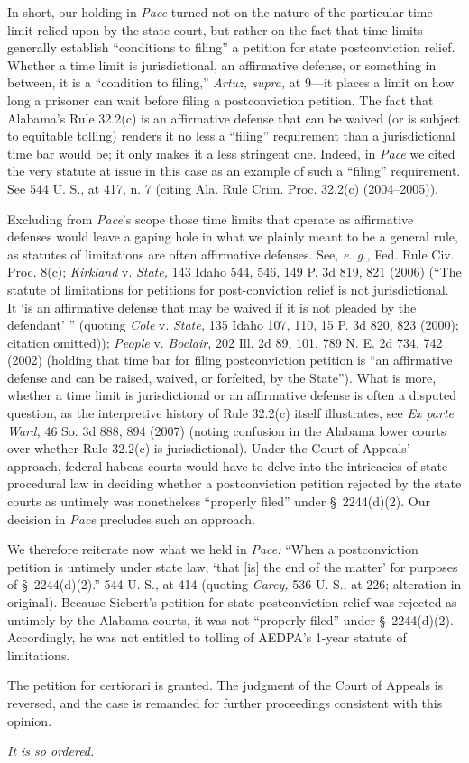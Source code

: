   In short, our holding in \emph{Pace} turned not on the nature of the
particular time limit relied upon by the state court, but rather on the
fact that time limits generally establish ``conditions to filing''
a petition for state postconviction relief. Whether a time limit is
jurisdictional, an affirmative defense, or something in between, it is
a ``condition to filing,'' \emph{Artuz, supra,} at 9---it places a
limit on how long a prisoner can wait before filing a postconviction
petition. The fact that Alabama's Rule 32.2(c) is an affirmative
defense that can be waived (or is subject to equitable tolling) renders
it no less a ``filing'' requirement than a jurisdictional time bar
would be; it only makes it a less stringent one. Indeed, in \emph{Pace}
we cited the very statute at issue in this case as an example of such
a ``filing'' requirement. See 544 U. S., at 417, n. 7 (citing Ala.
Rule Crim. Proc. 32.2(c) (2004--2005)).

  Excluding from \emph{Pace}'s scope those time limits that operate
as affirmative defenses would leave a gaping hole in what we plainly
meant to be a general rule, as statutes of limitations are often
affirmative defenses. See, \emph{e. g.,} Fed. Rule Civ. \newpage  Proc.
8(c); \emph{Kirkland} v. \emph{State,} 143 Idaho 544, 546, 149 P. 3d 819, 821
(2006) (``The statute of limitations for petitions for post-conviction
relief is not jurisdictional. It ‘is an affirmative defense that may
be waived if it is not pleaded by the defendant' '' (quoting \emph{Cole}
v. \emph{State,} 135 Idaho 107, 110, 15 P. 3d 820, 823 (2000); citation
omitted)); \emph{People} v. \emph{Boclair,} 202 Ill. 2d 89, 101, 789 N. E.
2d 734, 742 (2002) (holding that time bar for filing postconviction
petition is ``an affirmative defense and can be raised, waived, or
forfeited, by the State''). What is more, whether a time limit is
jurisdictional or an affirmative defense is often a disputed question,
as the interpretive history of Rule 32.2(c) itself illustrates, see
\emph{Ex parte Ward,} 46 So. 3d 888, 894 (2007) (noting confusion in the
Alabama lower courts over whether Rule 32.2(c) is jurisdictional).
Under the Court of Appeals' approach, federal habeas courts would
have to delve into the intricacies of state procedural law in deciding
whether a postconviction petition rejected by the state courts as
untimely was nonetheless ``properly filed'' under \S~2244(d)(2). Our
decision in \emph{Pace} precludes such an approach.

  We therefore reiterate now what we held in \emph{Pace:} ``When a
postconviction petition is untimely under state law, ‘that [is] the
end of the matter' for purposes of \S~2244(d)(2).'' 544 U. S., at
414 (quoting \emph{Carey,} 536 U. S., at 226; alteration in original).
Because Siebert's petition for state postconviction relief was
rejected as untimely by the Alabama courts, it was not ``properly
filed'' under \S~2244(d)(2). Accordingly, he was not entitled to
tolling of AEDPA's 1-year statute of limitations.

  The petition for certiorari is granted. The judgment of the Court of
Appeals is reversed, and the case is remanded for further proceedings
consistent with this opinion.

\begin{flushright}\emph{It is so ordered.}\end{flushright}
